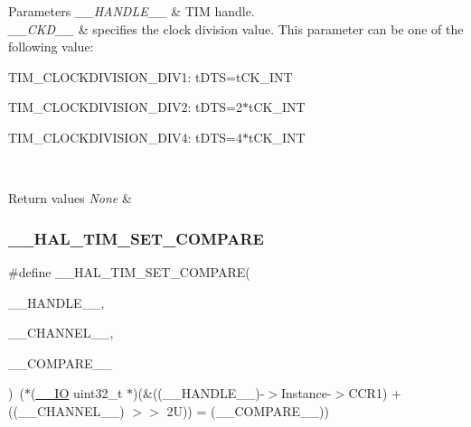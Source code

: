 \begin{DoxyParams}{Parameters}
{\em \+\_\+\+\_\+\+H\+A\+N\+D\+L\+E\+\_\+\+\_\+} & T\+IM handle. \\
\hline
{\em \+\_\+\+\_\+\+C\+K\+D\+\_\+\+\_\+} & specifies the clock division value. This parameter can be one of the following value\+: \begin{DoxyItemize}
\item T\+I\+M\+\_\+\+C\+L\+O\+C\+K\+D\+I\+V\+I\+S\+I\+O\+N\+\_\+\+D\+I\+V1\+: t\+D\+TS=t\+C\+K\+\_\+\+I\+NT \item T\+I\+M\+\_\+\+C\+L\+O\+C\+K\+D\+I\+V\+I\+S\+I\+O\+N\+\_\+\+D\+I\+V2\+: t\+D\+TS=2$\ast$t\+C\+K\+\_\+\+I\+NT \item T\+I\+M\+\_\+\+C\+L\+O\+C\+K\+D\+I\+V\+I\+S\+I\+O\+N\+\_\+\+D\+I\+V4\+: t\+D\+TS=4$\ast$t\+C\+K\+\_\+\+I\+NT \end{DoxyItemize}
\\
\hline
\end{DoxyParams}

\begin{DoxyRetVals}{Return values}
{\em None} & \\
\hline
\end{DoxyRetVals}
\mbox{\label{group___t_i_m___exported___macros_ga300d0c9624c3b072d3afeb7cef639b66}} 
\subsubsection{\texorpdfstring{\+\_\+\+\_\+\+H\+A\+L\+\_\+\+T\+I\+M\+\_\+\+S\+E\+T\+\_\+\+C\+O\+M\+P\+A\+RE}{\_\_HAL\_TIM\_SET\_COMPARE}}
{\footnotesize\ttfamily \#define \+\_\+\+\_\+\+H\+A\+L\+\_\+\+T\+I\+M\+\_\+\+S\+E\+T\+\_\+\+C\+O\+M\+P\+A\+RE(\begin{DoxyParamCaption}\item[{}]{\+\_\+\+\_\+\+H\+A\+N\+D\+L\+E\+\_\+\+\_\+,  }\item[{}]{\+\_\+\+\_\+\+C\+H\+A\+N\+N\+E\+L\+\_\+\+\_\+,  }\item[{}]{\+\_\+\+\_\+\+C\+O\+M\+P\+A\+R\+E\+\_\+\+\_\+ }\end{DoxyParamCaption})~($\ast$(\mbox{\hyperlink{core__sc300_8h_aec43007d9998a0a0e01faede4133d6be}{\+\_\+\+\_\+\+IO}} uint32\+\_\+t $\ast$)(\&((\+\_\+\+\_\+\+H\+A\+N\+D\+L\+E\+\_\+\+\_\+)-\/$>$Instance-\/$>$C\+C\+R1) + ((\+\_\+\+\_\+\+C\+H\+A\+N\+N\+E\+L\+\_\+\+\_\+) $>$$>$ 2\+U)) = (\+\_\+\+\_\+\+C\+O\+M\+P\+A\+R\+E\+\_\+\+\_\+))}



